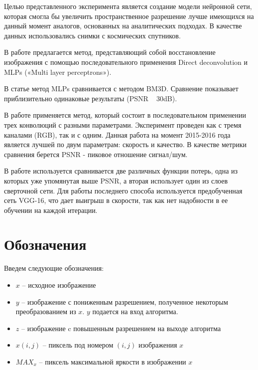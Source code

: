 \documentclass[12pt,twoside]{article}
\begin{document}
	Целью представленного эксперимента является создание модели нейронной сети, которая смогла бы увеличить пространственное разрешение лучше имеющихся на данный момент аналогов, основанных на аналитических подходах. В качестве данных использовались снимки с космических спутников.

	В работе \cite{schuler2013machine} предлагается метод, представляющий собой восстановление изображения с помощью последовательного применения Direct deconvolution и MLPs («Multi layer perceptrons»).

	В статье \cite{burger2012image} метод MLPs сравнивается с методом BM3D. Сравнение показывает приблизительно одинаковые результаты (PSNR ~ 30dB). 

	В работе \cite{dong2016image} применяется метод, который состоит в последовательном применении трех конволюций с разными параметрами. Эксперимент проведен как с тремя каналами (RGB), так и с одним. Данная работа на момент 2015-2016 года является лучшей по двум параметрам: скорость и качество. В качестве метрики сравнения берется PSNR - пиковое отношение сигнал/шум. 
	
	В работе \cite{johnson2016perceptual} используется сравнивается две различных функции потерь, одна из которых уже упомянутая выше PSNR, а вторая использует один из слоев сверточной сети. Для работы последнего способа используется предобученная сеть VGG-16, что дает выигрыш в скорости, так как нет надобности в ее обучении на каждой итерации.

	
\section{Обозначения}
	Введем следующие обозначения:
	\begin{itemize}
		\item $x$ -- исходное изображение
		\item $y$ -- изображение с пониженным разрешением, полученное некоторым преобразованием из $x$. $y$ подается на вход алгоритма.
		\item $z$ -- изображение c повышенным разрешением на выходе алгоритма
		\item $x(i,j)$ -- пиксель под номером $(i,j)$ изображения $x$ 
		\item $MAX_x$ -- пиксель максимальной яркости в изображении $x$
	\end{itemize}
	
\end{document}
